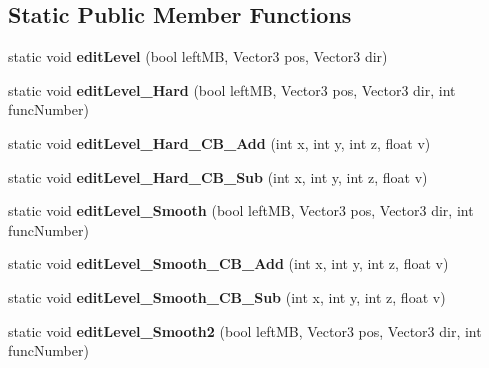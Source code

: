 \subsection*{\-Static \-Public \-Member \-Functions}
\begin{DoxyCompactItemize}
\item 
\hypertarget{classGame_a1ca117bc1dfa08ab6cda23b9a725a31e}{
static void {\bfseries edit\-Level} (bool left\-M\-B, \-Vector3 pos, \-Vector3 dir)}
\label{d9/d68/classGame_a1ca117bc1dfa08ab6cda23b9a725a31e}

\item 
\hypertarget{classGame_a5aeaad23274e5439847acd01da99f999}{
static void {\bfseries edit\-Level\-\_\-\-Hard} (bool left\-M\-B, \-Vector3 pos, \-Vector3 dir, int func\-Number)}
\label{d9/d68/classGame_a5aeaad23274e5439847acd01da99f999}

\item 
\hypertarget{classGame_a5b0ce2e4e9dc73652fce1665bc158b56}{
static void {\bfseries edit\-Level\-\_\-\-Hard\-\_\-\-C\-B\-\_\-\-Add} (int x, int y, int z, float v)}
\label{d9/d68/classGame_a5b0ce2e4e9dc73652fce1665bc158b56}

\item 
\hypertarget{classGame_aef562acc3f5217a67a2fd30193c6fba7}{
static void {\bfseries edit\-Level\-\_\-\-Hard\-\_\-\-C\-B\-\_\-\-Sub} (int x, int y, int z, float v)}
\label{d9/d68/classGame_aef562acc3f5217a67a2fd30193c6fba7}

\item 
\hypertarget{classGame_ad7233912a31e58c6a2b5189c075a07ec}{
static void {\bfseries edit\-Level\-\_\-\-Smooth} (bool left\-M\-B, \-Vector3 pos, \-Vector3 dir, int func\-Number)}
\label{d9/d68/classGame_ad7233912a31e58c6a2b5189c075a07ec}

\item 
\hypertarget{classGame_aba000d448fcdb81888867a532d4c5ec1}{
static void {\bfseries edit\-Level\-\_\-\-Smooth\-\_\-\-C\-B\-\_\-\-Add} (int x, int y, int z, float v)}
\label{d9/d68/classGame_aba000d448fcdb81888867a532d4c5ec1}

\item 
\hypertarget{classGame_af1c3b8fc3ed7b85a98f67e413423437c}{
static void {\bfseries edit\-Level\-\_\-\-Smooth\-\_\-\-C\-B\-\_\-\-Sub} (int x, int y, int z, float v)}
\label{d9/d68/classGame_af1c3b8fc3ed7b85a98f67e413423437c}

\item 
\hypertarget{classGame_a60227ebc1448524c0edf33d14c6740d3}{
static void {\bfseries edit\-Level\-\_\-\-Smooth2} (bool left\-M\-B, \-Vector3 pos, \-Vector3 dir, int func\-Number)}
\label{d9/d68/classGame_a60227ebc1448524c0edf33d14c6740d3}


\end{DoxyCompactItemize}
